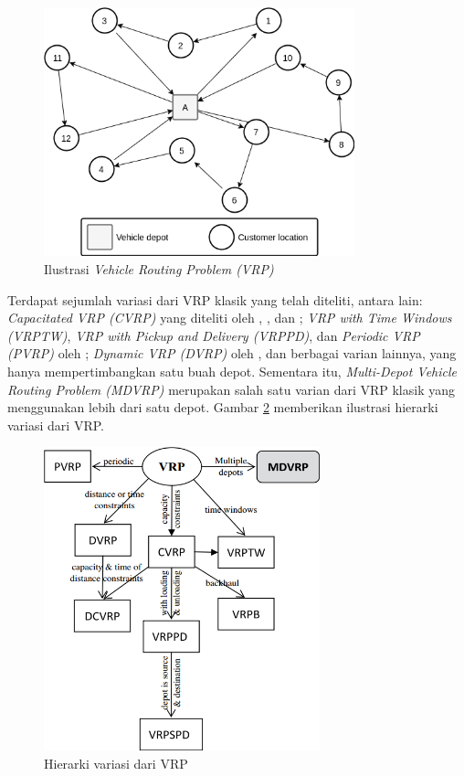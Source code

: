 \begin{figure}[!]
	\centering
	\includegraphics[width=9cm]{Resources/Images/vrp-ilustration}
	\captionsetup{format=hang}
	\caption{Ilustrasi \textit{Vehicle Routing Problem (VRP)}}
	\label{fig:vrp-ilustration}
\end{figure}


Terdapat sejumlah variasi dari VRP klasik yang telah diteliti, antara lain: \textit{Capacitated VRP (CVRP)} yang diteliti oleh \citep{baldacci_exact_2010}, \citep{cordeau_chapter_2007}, dan \citep{toth_vehicle_2002}; \textit{VRP with Time Windows (VRPTW)}, \textit{VRP with Pickup and Delivery (VRPPD)}, dan \textit{Periodic VRP (PVRP)} oleh \citep{solomon_survey_1988}; \textit{Dynamic VRP (DVRP)} oleh \citep{psaraftis_dynamic_1995}, dan berbagai varian lainnya, yang hanya mempertimbangkan satu buah depot. Sementara itu, \textit{Multi-Depot Vehicle Routing Problem (MDVRP)} merupakan salah satu varian dari VRP klasik yang menggunakan lebih dari satu depot. Gambar \ref{fig:vrp-variants} memberikan ilustrasi hierarki variasi dari VRP.


\begin{figure}[!]
	\centering
	\includegraphics[width=8cm]{Resources/Images/vrp-variants}
	\captionsetup{format=hang}
	\caption{Hierarki variasi dari VRP \citep{weise_solving_2009}}
	\label{fig:vrp-variants}
\end{figure}


